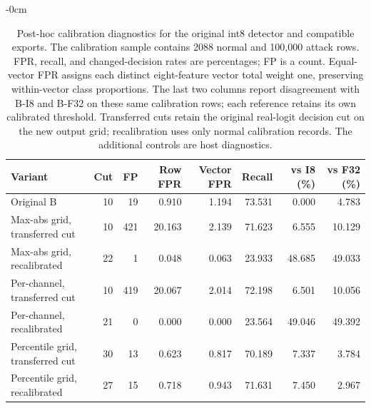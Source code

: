 \begin{table}[!htbp]
\begin{adjustwidth}{-\extralength}{0cm}
\caption{Post-hoc calibration diagnostics for the original int8 detector and compatible exports. The calibration sample contains 2088 normal and 100,000 attack rows. FPR, recall, and changed-decision rates are percentages; FP is a count. Equal-vector FPR assigns each distinct eight-feature vector total weight one, preserving within-vector class proportions. The last two columns report disagreement with B-I8 and B-F32 on these same calibration rows; each reference retains its own calibrated threshold. Transferred cuts retain the original real-logit decision cut on the new output grid; recalibration uses only normal calibration records. The additional controls are host diagnostics.}
\label{tab:posthoc-export}
\centering\small
\setlength{\tabcolsep}{3.5pt}
\begin{tabular}{lrrrrrrr}
\toprule
Variant & Cut & FP & Row FPR & Vector FPR & Recall & vs I8 (\%) & vs F32 (\%) \\
\midrule
Original B & 10 & 19 & 0.910 & 1.194 & 73.531 & 0.000 & 4.783 \\
\midrule
Max-abs grid, transferred cut & 10 & 421 & 20.163 & 2.139 & 71.623 & 6.555 & 10.129 \\
Max-abs grid, recalibrated & 22 & 1 & 0.048 & 0.063 & 23.933 & 48.685 & 49.033 \\
Per-channel, transferred cut & 10 & 419 & 20.067 & 2.014 & 72.198 & 6.501 & 10.056 \\
Per-channel, recalibrated & 21 & 0 & 0.000 & 0.000 & 23.564 & 49.046 & 49.392 \\
\midrule
Percentile grid, transferred cut & 30 & 13 & 0.623 & 0.817 & 70.189 & 7.337 & 3.784 \\
Percentile grid, recalibrated & 27 & 15 & 0.718 & 0.943 & 71.631 & 7.450 & 2.967 \\
\bottomrule
\end{tabular}
\end{adjustwidth}
\end{table}
